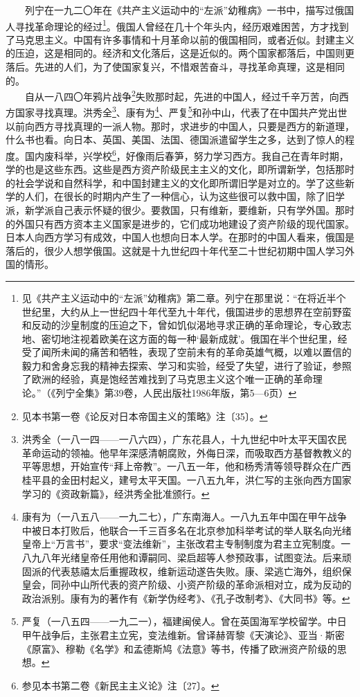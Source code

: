 \documentclass[cn,11pt,chinese]{elegantbook}
\begin{document}
　　列宁在一九二〇年在《共产主义运动中的“左派”幼稚病》一书中，描写过俄国人寻找革命理论的经过\footnote[1]{ 见《共产主义运动中的“左派”幼稚病》第二章。列宁在那里说：“在将近半个世纪里，大约从上一世纪四十年代至九十年代，俄国进步的思想界在空前野蛮和反动的沙皇制度的压迫之下，曾如饥似渴地寻求正确的革命理论，专心致志地、密切地注视着欧美在这方面的每一种‘最新成就’。俄国在半个世纪里，经受了闻所未闻的痛苦和牺牲，表现了空前未有的革命英雄气概，以难以置信的毅力和舍身忘我的精神去探索、学习和实验，经受了失望，进行了验证，参照了欧洲的经验，真是饱经苦难找到了马克思主义这个唯一正确的革命理论。”（《列宁全集》第39卷，人民出版社1986年版，第5—6页）}。俄国人曾经在几十个年头内，经历艰难困苦，方才找到了马克思主义。中国有许多事情和十月革命以前的俄国相同，或者近似。封建主义的压迫，这是相同的。经济和文化落后，这是近似的。两个国家都落后，中国则更落后。先进的人们，为了使国家复兴，不惜艰苦奋斗，寻找革命真理，这是相同的。\\
　　自从一八四〇年鸦片战争\footnote[2]{ 见本书第一卷《论反对日本帝国主义的策略》注〔35〕。}失败那时起，先进的中国人，经过千辛万苦，向西方国家寻找真理。洪秀全\footnote[3]{ 洪秀全（一八一四——一八六四），广东花县人，十九世纪中叶太平天国农民革命运动的领袖。他早年深感清朝腐败，外侮日深，而吸取西方基督教教义的平等思想，开始宣传“拜上帝教”。一八五一年，他和杨秀清等领导群众在广西桂平县的金田村起义，建号太平天国。一八五九年，洪仁写的主张向西方国家学习的《资政新篇》，经洪秀全批准颁行。}、康有为\footnote[4]{ 康有为（一八五八——一九二七），广东南海人。一八九五年中国在甲午战争中被日本打败后，他联合一千三百多名在北京参加科举考试的举人联名向光绪皇帝上“万言书”，要求“变法维新”，主张改君主专制制度为君主立宪制度。一八九八年光绪皇帝任用他和谭嗣同、梁启超等人参预政事，试图变法。后来顽固派的代表慈禧太后重握政权，维新运动遂告失败。康、梁逃亡海外，组织保皇会，同孙中山所代表的资产阶级、小资产阶级的革命派相对立，成为反动的政治派别。康有为的著作有《新学伪经考》、《孔子改制考》、《大同书》等。}、严复\footnote[5]{ 严复（一八五四——一九二一），福建闽侯人。曾在英国海军学校留学。中日甲午战争后，主张君主立宪，变法维新。曾译赫胥黎《天演论》、亚当·斯密《原富》、穆勒《名学》和孟德斯鸠《法意》等书，传播了欧洲资产阶级的思想。}和孙中山，代表了在中国共产党出世以前向西方寻找真理的一派人物。那时，求进步的中国人，只要是西方的新道理，什么书也看。向日本、英国、美国、法国、德国派遣留学生之多，达到了惊人的程度。国内废科举，兴学校\footnote[6]{ 参见本书第二卷《新民主主义论》注〔27〕。}，好像雨后春笋，努力学习西方。我自己在青年时期，学的也是这些东西。这些是西方资产阶级民主主义的文化，即所谓新学，包括那时的社会学说和自然科学，和中国封建主义的文化即所谓旧学是对立的。学了这些新学的人们，在很长的时期内产生了一种信心，认为这些很可以救中国，除了旧学派，新学派自己表示怀疑的很少。要救国，只有维新，要维新，只有学外国。那时的外国只有西方资本主义国家是进步的，它们成功地建设了资产阶级的现代国家。日本人向西方学习有成效，中国人也想向日本人学。在那时的中国人看来，俄国是落后的，很少人想学俄国。这就是十九世纪四十年代至二十世纪初期中国人学习外国的情形。\\
\end{document}
